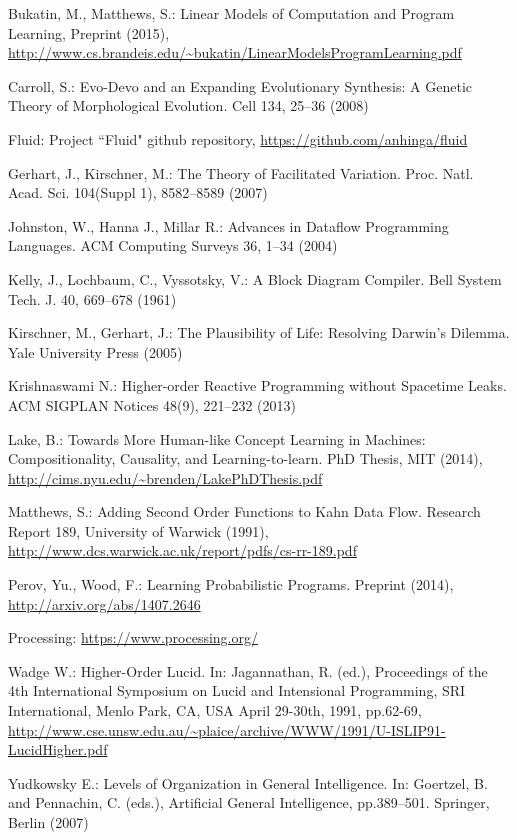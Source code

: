 \documentclass{llncs}
\begin{document}
\begin{thebibliography}{9}

 Bukatin, M., Matthews, S.:  Linear Models of Computation and Program Learning, Preprint (2015),
\newline \url{http://www.cs.brandeis.edu/~bukatin/LinearModelsProgramLearning.pdf}

 Carroll, S.: Evo-Devo and an Expanding Evolutionary Synthesis: A Genetic Theory of
Morphological Evolution. Cell 134, 25--36 (2008) 

 Fluid: Project ``Fluid" github repository, 
\url{https://github.com/anhinga/fluid}


 Gerhart, J., Kirschner, M.: The Theory of Facilitated Variation. Proc. Natl. Acad. Sci. 104(Suppl 1), 8582--8589 (2007)

 Johnston, W., Hanna J., Millar R.: Advances in Dataflow Programming Languages. ACM Computing Surveys 36, 1--34 (2004) 

 Kelly, J., Lochbaum, C., Vyssotsky, V.: A Block Diagram Compiler. Bell System Tech. J. 40, 669--678 (1961) 

 Kirschner, M., Gerhart, J.: The Plausibility of Life: Resolving Darwin's Dilemma. Yale University Press (2005) 

 Krishnaswami N.: Higher-order Reactive Programming without Spacetime Leaks. ACM SIGPLAN Notices
48(9), 221--232 (2013)


 Lake, B.: Towards More Human-like Concept Learning in Machines:
Compositionality, Causality, and Learning-to-learn. PhD Thesis, MIT (2014), \newline\url{http://cims.nyu.edu/~brenden/LakePhDThesis.pdf}

 Matthews, S.: Adding Second Order Functions to Kahn Data Flow. Research Report 189, University of Warwick (1991),
\newline\url{http://www.dcs.warwick.ac.uk/report/pdfs/cs-rr-189.pdf}

 Perov, Yu., Wood, F.: Learning Probabilistic Programs. Preprint (2014), \newline\url{http://arxiv.org/abs/1407.2646}

 Processing: \url{https://www.processing.org/}

 Wadge W.: Higher-Order Lucid. In:  Jagannathan, R. (ed.), Proceedings of the 4th International Symposium on Lucid and Intensional Programming,
SRI International, Menlo Park, CA, USA April 29-30th, 1991, pp.62-69, \url{http://www.cse.unsw.edu.au/~plaice/archive/WWW/1991/U-ISLIP91-LucidHigher.pdf}

 Yudkowsky E.: Levels of Organization in General Intelligence. 
In:  Goertzel, B. and Pennachin, C. (eds.), Artificial General Intelligence, pp.389--501.
Springer, Berlin (2007)

\end{thebibliography}
\end{document}

